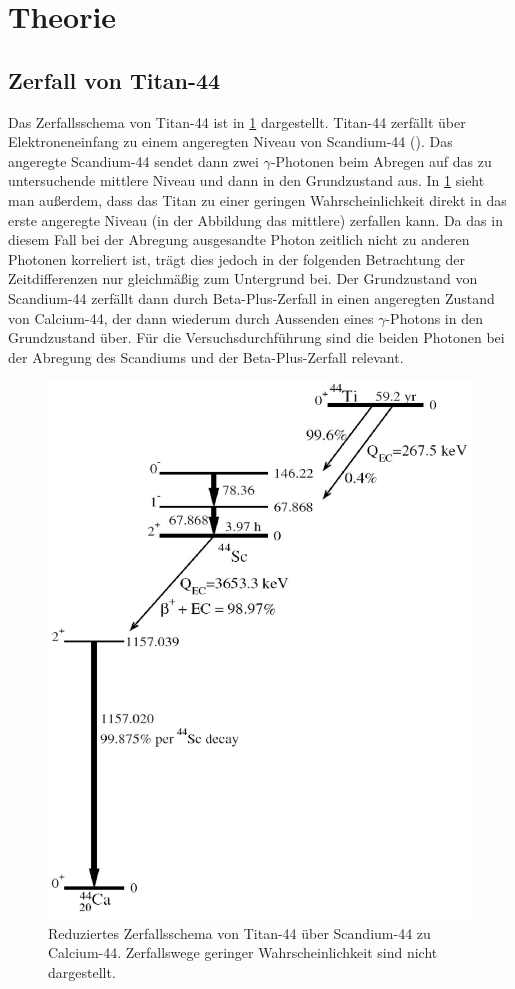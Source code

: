 \documentclass[
	a4paper,
	12pt,
	pagesize,
	ngerman
]{scrartcl}
\begin{document}
  \section{Theorie}
	\subsection{Zerfall von Titan-44}

	Das Zerfallsschema von Titan-44 ist in \cref{fig_Zerfallsschema} dargestellt. Titan-44 zerfällt über Elektroneneinfang zu einem angeregten Niveau von Scandium-44 (\cite{Anleitung}). %
	Das angeregte Scandium-44 sendet dann zwei $\gamma$-Photonen beim Abregen auf das zu untersuchende mittlere Niveau und dann in den Grundzustand aus.
	In \cref{fig_Zerfallsschema} sieht man außerdem, dass das Titan zu einer geringen Wahrscheinlichkeit direkt in das erste angeregte Niveau (in der Abbildung das mittlere) zerfallen kann.
	Da das in diesem Fall bei der Abregung ausgesandte Photon zeitlich nicht zu anderen Photonen korreliert ist, trägt dies jedoch in der folgenden Betrachtung der Zeitdifferenzen nur gleichmäßig zum Untergrund bei.
	Der Grundzustand von Scandium-44 zerfällt dann durch Beta-Plus-Zerfall in einen angeregten Zustand von Calcium-44, der dann wiederum durch Aussenden eines $\gamma$-Photons in den Grundzustand über.
	Für die Versuchsdurchführung sind die beiden Photonen bei der Abregung des Scandiums und der Beta-Plus-Zerfall relevant.
	\begin{figure}[H]
			\includegraphics[width=0.6\linewidth]{img/44Ti-decay_reduziert}
			\caption{
			Reduziertes Zerfallsschema von Titan-44 über Scandium-44 zu Calcium-44. Zerfallswege geringer Wahrscheinlichkeit sind nicht dargestellt.
			\cite{Zerfallsschema} %
			}
			\label{fig_Zerfallsschema}
	\end{figure}
\end{document}
